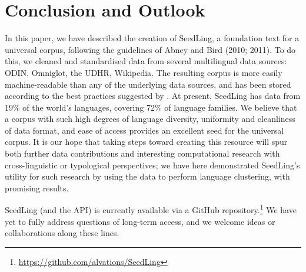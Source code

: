 \section{Conclusion and Outlook} \label{sec:conclusion}

In this paper, we have described the creation of SeedLing, a foundation text for a universal corpus, following the guidelines of Abney and Bird (2010; 2011). To do this, we cleaned and standardised data from several multilingual data sources: ODIN, Omniglot, the UDHR, Wikipedia. The resulting corpus is more easily machine-readable than any of the underlying data sources, and has been stored according to the best practices suggested by . At present, SeedLing has data from 19\% of the world's languages, covering 72\% of language families. We believe that a corpus with such high degrees of language diversity, uniformity and cleanliness of data format, and ease of access provides an excellent seed for the universal corpus. It is our hope that taking steps toward creating this resource will spur both further data contributions and interesting computational research with cross-linguistic or typological perspectives; we have here demonstrated SeedLing's utility for such research by using the data to perform language clustering, with promising results.

SeedLing (and the API) is currently available via a GitHub repository.\footnote{\url{https://github.com/alvations/SeedLing}} We have yet to fully address questions of long-term access, and we welcome ideas or collaborations along these lines.
